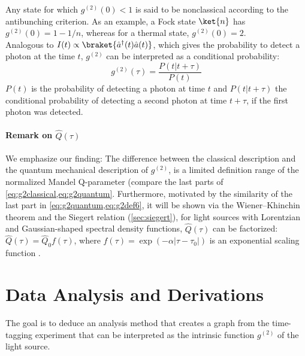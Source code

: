 Any state for which $g^{(2)}(0) < 1$ is said to be nonclassical according to the antibunching criterion. As an example, a Fock state $\ket{n}$ has $g^{(2)}(0) =1-1/n$, whereas for a thermal state, $g^{(2)}(0)=2$.\\
Analogous to $I(t)\propto\braket{\hat{a}^\dagger(t)\hat{a}(t)}$, which gives the probability to detect a photon at the time
$t$, $g^{(2)}$ can be interpreted as a conditional probability:
\begin{equation}\label{eq:g2def4}
	g^{(2)}(\tau)=\dfrac{P(t|t+\tau)}{P(t)}
\end{equation}
$P(t)$ is the probability of detecting a photon at time $t$ and $P(t|t+\tau)$ the conditional probability of detecting a second photon at time $t + \tau$, if the first photon was detected.

\paragraph{Remark on $\hat{Q}(\tau)$} We emphasize our finding: The difference between the classical description and the quantum mechanical description of $g^{(2)}$, is a limited definition range of the normalized Mandel Q-parameter (compare the last parts of \cref{eq:g2classical,eq:g2quantum}. Furthermore, motivated by the similarity of the last part in \cref{eq:g2quantum,eq:g2def6}, it will be shown via the Wiener--Khinchin theorem and the Siegert relation (\cref{sec:siegert}), for light sources with Lorentzian and Gaussian-shaped spectral density functions, $\hat{Q}(\tau)$ can be factorized:\\ $\hat{Q}(\tau)=\hat{Q}_0 f(\tau)$, where $f(\tau)=\exp(-\alpha|\tau-\tau_0|)$ is an exponential scaling function \cite{ann_observation_2019}.

\section{Data Analysis and Derivations}
The goal is to deduce an analysis method that creates a graph from the time-tagging experiment that can be interpreted as the intrinsic function $g^{(2)}$ of the light source.

